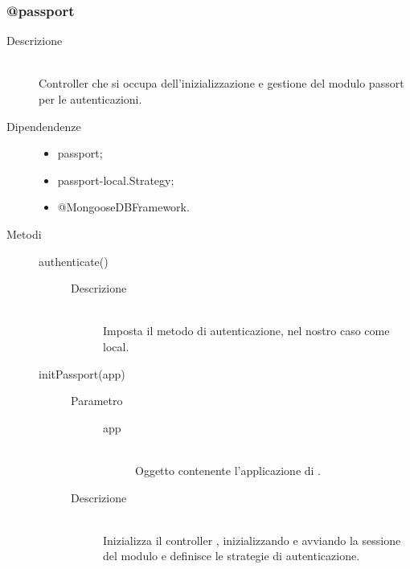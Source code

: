\subsubsection{@passport}
\begin{description}
 \item[Descrizione] \hfill \\
Controller che si occupa dell'inizializzazione e gestione del modulo passort per le autenticazioni.
\item[Dipendendenze] \hfill
  \begin{itemize}
   \item passport;
   \item passport-local.Strategy;
   \item @MongooseDBFramework.
  \end{itemize}
   \item[Metodi] \hfill
    \begin{description}
     \item[authenticate()] \hfill 
      \begin{description}
        \item[Descrizione] \hfill \\
          Imposta il metodo di autenticazione, nel nostro caso come local.
      \end{description}
     
     \item[initPassport(app)] \hfill 
     \begin{description}
          \item[Parametro] \hfill
          \begin{description}
           \item[app] \hfill \\
           Oggetto contenente l'applicazione di .
          \end{description}
          \item[Descrizione] \hfill \\
          Inizializza il controller , inizializzando e avviando la sessione del modulo  e definisce le strategie di autenticazione.
            \end{description}
            

\end{description}
\end{description}
